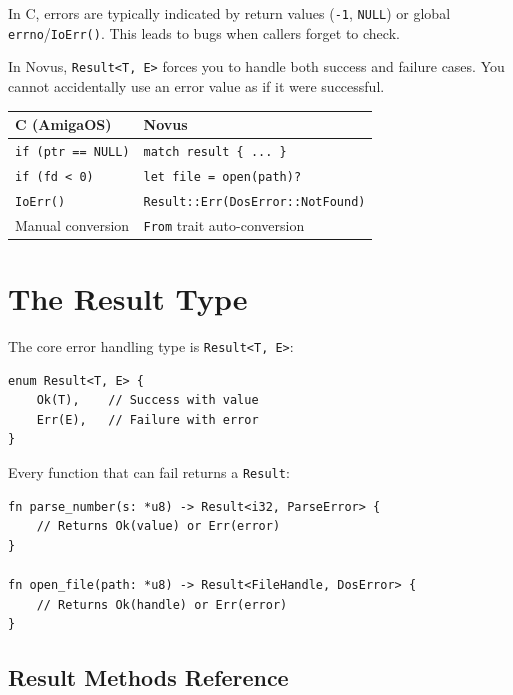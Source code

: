 \begin{comingfromc}
In C, errors are typically indicated by return values (\texttt{-1}, \texttt{NULL}) or global \texttt{errno}/\texttt{IoErr()}. This leads to bugs when callers forget to check.

In Novus, \texttt{Result<T, E>} forces you to handle both success and failure cases. You cannot accidentally use an error value as if it were successful.

\begin{center}
\begin{tabular}{ll}
\textbf{C (AmigaOS)} & \textbf{Novus} \\
\hline
\texttt{if (ptr == NULL)} & \texttt{match result \{ ... \}} \\
\texttt{if (fd < 0)} & \texttt{let file = open(path)?} \\
\texttt{IoErr()} & \texttt{Result::Err(DosError::NotFound)} \\
Manual conversion & \texttt{From} trait auto-conversion \\
\end{tabular}
\end{center}
\end{comingfromc}

\section{The Result Type}
\label{sec:result-type}

The core error handling type is \texttt{Result<T, E>}:

\begin{lstlisting}
enum Result<T, E> {
    Ok(T),    // Success with value
    Err(E),   // Failure with error
}
\end{lstlisting}

Every function that can fail returns a \texttt{Result}:

\begin{lstlisting}
fn parse_number(s: *u8) -> Result<i32, ParseError> {
    // Returns Ok(value) or Err(error)
}

fn open_file(path: *u8) -> Result<FileHandle, DosError> {
    // Returns Ok(handle) or Err(error)
}
\end{lstlisting}

\subsection{Result Methods Reference}


